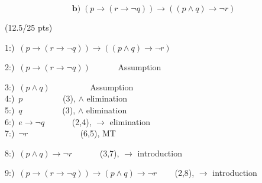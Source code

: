 \documentclass[a4paper,12pt]{article}
\begin{document}
\newpage
\begin{equation*}
     \textbf{b)} \;  (p \rightarrow (r \rightarrow \neg q)) \rightarrow ((p \wedge q) \rightarrow \neg r)
\end{equation*}

\hfill \small{(12.5/25 pts)}\\
\begin{tcolorbox}

\begin{center}
1:)\, $(p \rightarrow (r \rightarrow \neg q))\rightarrow (( p \wedge q) \rightarrow \neg r ) $ \\
\begin{tcolorbox}
\begin{center}
2:)\, $(p \rightarrow (r \rightarrow \neg q)) $  \,\,\,\,\,\,\,\,\,\,\,\,\,\,\,\, Assumption
\begin{tcolorbox}
\begin{center}
    3:)\, $(p \wedge q ) $  \,\,\,\,\,\,\,\,\,\,\,\,\,\,\,\,\,\,\,\,\,\,\,\,\, Assumption\\
    4:)\, $p   $  \,\,\,\,\,\,\,\,\,\,\,\,\,\,\,\,\,\,\,\,\,\,\,\,\,  (3), $\wedge $ elimination \\
    5:)\, $q   $  \,\,\,\,\,\,\,\,\,\,\,\,\,\,\,\,\,\,\,\,\,\,\,\,\,  (3), $\wedge $ elimination\\ 
    6:)\, $e \rightarrow \neg q   $  \,\,\,\,\,\,\,\,\,\,\,\,\,\,\,\,  (2,4), $\rightarrow $ elimination \\
    7:)\, $ \neg r   $  \,\,\,\,\,\,\,\,\,\,\,\,\,\,\,\,\,\,\,\,\,\,\,\,\,\,\,\,\,\,\,\,\,\,  (6,5),  MT \\
\end{center}
\end{tcolorbox}
8:)\, $(p \wedge q)\rightarrow \neg r  $  \,\,\,\,\,\,\,\,\,\,\,\,\,\,\,\,  (3,7), $\rightarrow $ introduction 
\end{center}
\end{tcolorbox}
9:)\, $(p \rightarrow (r \rightarrow \neg q))\rightarrow(p \wedge q)\rightarrow \neg r  $  \,\,\,\,\,\,\,\,\,  (2,8), $\rightarrow $ introduction  \\


\end{center}
\end{tcolorbox}
\end{document}
